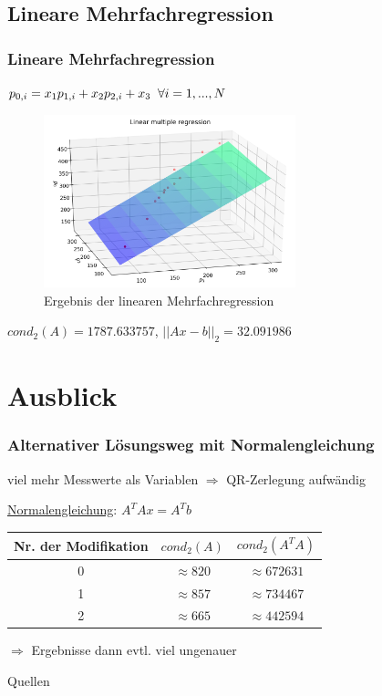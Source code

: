\documentclass{beamer}
\begin{document}
\subsection{Lineare Mehrfachregression}
\begin{frame} %
  \frametitle{Lineare Mehrfachregression} %
\centering
$p_{0,i} = x_1 p_{1,i} + x_2 p_{2, i} + x_3 \thickspace \thickspace \forall i = 1,...,N$

  \begin{figure}

    \centering
      \includegraphics[width=0.65\textwidth]{Linear_Multi_Regression}
      \vspace{-1em}
    \caption{Ergebnis der linearen Mehrfachregression}
  \end{figure}
  \vspace{-1em}
  \centering

  $cond_2(A)=1787.633757$, $||Ax-b||_2=32.091986$

\end{frame}

\section{Ausblick}

\begin{frame} %
  \frametitle{Alternativer Lösungsweg mit Normalengleichung} %
\centering

viel mehr Messwerte als Variablen $\Rightarrow$ QR-Zerlegung aufwändig
\bigskip

\underline{Normalengleichung}: $A^T Ax = A^T b$
\bigskip

\pause
\begin{tabular}{c|c|c}
  Nr. der Modifikation & $cond_2(A)$   & $cond_2(A^T A)$\\ \hline
                     0 & $\approx 820$  & $\approx 672631$\\ \hline
                     1 & $\approx 857$  & $\approx 734467$\\ \hline
                     2 & $\approx 665$  & $\approx 442594$
\end{tabular}

\pause
\bigskip

$\Rightarrow$ Ergebnisse dann evtl. viel ungenauer

\end{frame}

\begin{frame}{Quellen}
  
  
  \nocite{*}
\end{frame}
\end{document}
